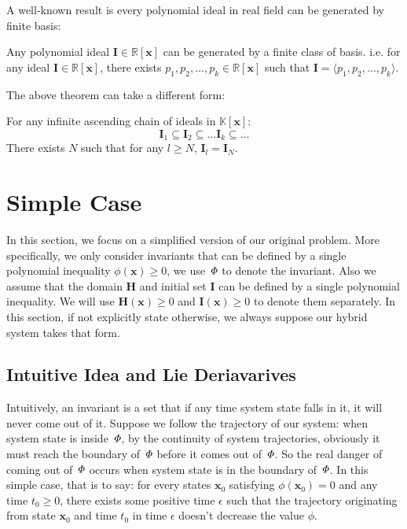 \documentclass{jssc}
\begin{document}
A well-known result is every polynomial ideal in real field can be generated by finite basis:

\begin{theorem}
Any polynomial ideal $\boldsymbol{I} \in \mathbb{R}[\boldsymbol{x}]$ can be generated by a finite class of basis. i.e. for any ideal $\boldsymbol{I} \in \mathbb{R}[\boldsymbol{x}]$, there exists $p_1, p_2, \dots, p_k \in \mathbb{R}[\boldsymbol{x}]$ such that $\boldsymbol{I} = \langle p_1, p_2, \dots, p_k \rangle$.
\end{theorem}

The above theorem can take a different form:
\begin{theorem}
\label{thm:ascendingChain}
For any infinite ascending chain of ideals in $\mathbb{K}[\boldsymbol{x}]$:
	\begin{equation*}
		\boldsymbol{I}_1 \subseteq \boldsymbol{I}_2 \subseteq \dots \boldsymbol{I}_k \subseteq \dots
	\end{equation*}
There exists $N$ such that for any $l \geq N$, $\boldsymbol{I}_l = \boldsymbol{I}_N$.
\end{theorem}

\section{Simple Case}
\label{sec:simple}
In this section, we focus on a simplified version of our original problem. More specifically, we only consider invariants that can be defined by a single polynomial inequality $\phi(\boldsymbol{x}) \geq 0$, we use ${\it \Phi}$ to denote the invariant. Also we assume that the domain $\boldsymbol{H}$ and initial set $\boldsymbol{I}$ can be defined by a single polynomial inequality. We will use $\boldsymbol{H}(\boldsymbol{x}) \geq 0$ and $\boldsymbol{I}(\boldsymbol{x}) \geq 0$ to denote them separately. In this section, if not explicitly state otherwise, we always suppose our hybrid system takes that form.

\subsection{Intuitive Idea and Lie Deriavarives}
Intuitively, an invariant is a set that if any time system state falls in it, it will never come out of it. Suppose we follow the trajectory of our system: when system state is inside  ${\it \Phi}$, by the continuity of system trajectories, obviously it must reach the boundary of ${\it \Phi}$ before it comes out of ${\it \Phi}$. So the real danger of coming out of ${\it \Phi}$ occurs when system state is in the boundary of ${\it \Phi}$. In this simple case, that is to say: for every states $\boldsymbol{x}_0$ satisfying $\phi(\boldsymbol{x}_0) = 0$ and any time $t_0 \geq 0$, there exists some positive time $\epsilon$ such that the trajectory originating from state $\boldsymbol{x}_0$ and time $t_0$ in time $\epsilon$ doesn't decrease the value $\phi$.
\end{document}
